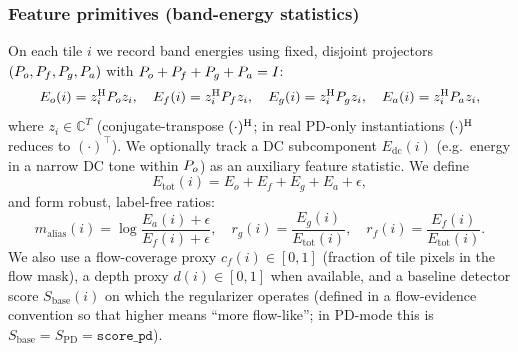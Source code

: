 \subsubsection{Feature primitives (band-energy statistics)}
On each tile $i$ we record band energies using fixed, disjoint projectors $(P_o,P_f,P_g,P_a)$ with $P_o+P_f+P_g+P_a=I$:
\[
E_o(i)=z_i^{\mathrm{H}} P_o z_i,\quad E_f(i)=z_i^{\mathrm{H}} P_f z_i,\quad E_g(i)=z_i^{\mathrm{H}} P_g z_i,\quad E_a(i)=z_i^{\mathrm{H}} P_a z_i,
\]
where $z_i\in\mathbb{C}^T$ (conjugate-transpose $(\cdot)^{\mathrm{H}}$; in real PD-only instantiations $(\cdot)^{\mathrm{H}}$ reduces to $(\cdot)^\top$). We optionally track a DC subcomponent $E_{\mathrm{dc}}(i)$ (e.g.\ energy in a narrow DC tone within $P_o$) as an auxiliary feature statistic. We define
\[
E_{\mathrm{tot}}(i)=E_o+E_f+E_g+E_a+\epsilon,
\]
and form robust, label-free ratios:
\[
m_{\mathrm{alias}}(i)=\log\frac{E_a(i)+\epsilon}{E_f(i)+\epsilon},\quad
r_g(i)=\frac{E_g(i)}{E_{\mathrm{tot}}(i)},\quad
r_f(i)=\frac{E_f(i)}{E_{\mathrm{tot}}(i)}.
\]
We also use a flow-coverage proxy $c_f(i)\in[0,1]$ (fraction of tile pixels in the flow mask), a depth proxy $d(i)\in[0,1]$ when available, and a baseline detector score $S_{\mathrm{base}}(i)$ on which the regularizer operates (defined in a flow-evidence convention so that higher means ``more flow-like''; in PD-mode this is $S_{\mathrm{base}}=S_{\mathrm{PD}}=\texttt{score\_pd}$).

